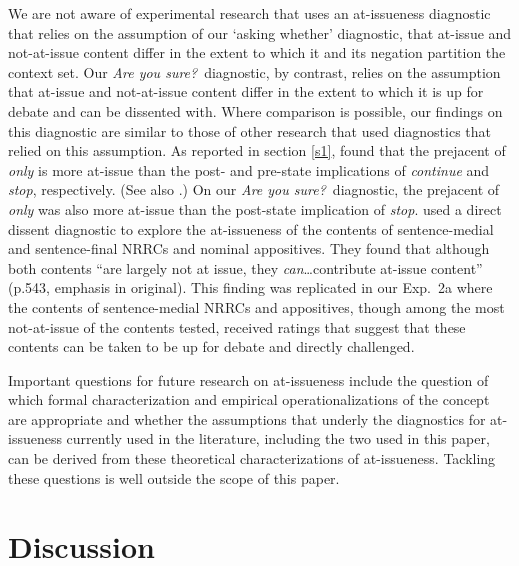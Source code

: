 \documentclass[11pt,fleqn]{article}
\newcommand{\6}{\mbox{$[\hspace*{-.6mm}[$}}
\newcommand{\9}{\mbox{$]\hspace*{-.6mm}]$}}
\begin{document}
We are not aware of experimental research that uses an at-issueness diagnostic that relies on the assumption of our `asking whether' diagnostic, that at-issue and not-at-issue content differ in the extent to which it and its negation partition the context set. Our {\em Are you sure?}~diagnostic, by contrast, relies on the assumption that at-issue and not-at-issue content differ in the extent to which it is up for debate and can be dissented with. Where comparison is possible, our findings on this diagnostic are similar to those of other research that used diagnostics that relied on this assumption. As reported in section \ref{s1}, \citet{amaral-etal11} found that the prejacent of {\em only} is more at-issue than the post- and pre-state implications of {\em continue} and {\em stop}, respectively. (See also \citealt{cummins-etal2012}.) On our {\em Are you sure?}~diagnostic, the prejacent of {\em only} was also more at-issue than the post-state implication of {\em stop}. \citet{syrett-koev2015} used a direct dissent diagnostic to explore the at-issueness of the contents of sentence-medial and sentence-final NRRCs and nominal appositives. They found that although both contents ``are largely not at issue, they {\em can}\ldots contribute at-issue content'' (p.543, emphasis in original). This finding was replicated in our Exp.~2a where the contents of sentence-medial NRRCs and appositives, though among the most not-at-issue of the contents tested, received ratings that suggest that these contents can be taken to be up for debate and directly challenged.

Important questions for future research on at-issueness include the question of which formal characterization and empirical operationalizations of the concept are appropriate and whether the assumptions that underly the diagnostics for at-issueness currently used in the literature, including the two used in this paper, can be derived from these theoretical characterizations of at-issueness. Tackling these questions is well outside the scope of this paper.


 

\section{Discussion}\label{s5}
\end{document}
